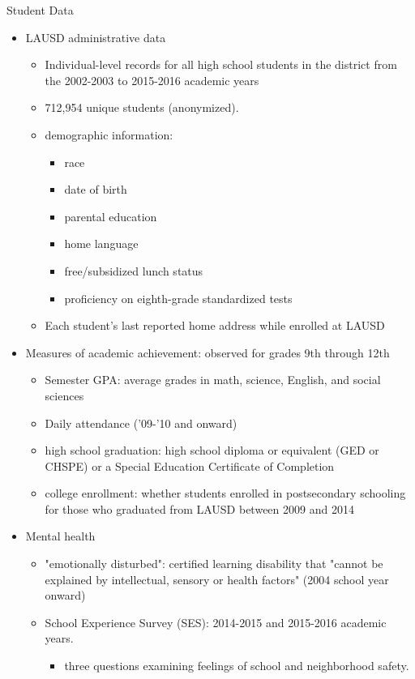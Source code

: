 \documentclass[dvipdfmx]{beamer}
\begin{document}
\begin{frame}{Student Data}
  \begin{itemize}
    \item LAUSD administrative data
    \begin{itemize}
      \item Individual-level records for all high school students in the district from the 2002-2003 to 2015-2016 academic years
      \item 712,954 unique students (anonymized).
      \item demographic information:
      \begin{itemize}
        \item race 
        \item date of birth 
        \item parental education 
        \item home language 
        \item free/subsidized lunch status
        \item proficiency on eighth-grade standardized tests
      \end{itemize}
      \item Each student's last reported home address while enrolled at LAUSD
    \end{itemize}
  \end{itemize}
\end{frame}

\begin{frame}{}
  \begin{itemize}
    \item Measures of academic achievement: observed for grades 9th through 12th
    \begin{itemize}
      \item Semester GPA: average grades in math, science, English, and social sciences
      \item Daily attendance ('09-'10 and onward)
      \item high school graduation: high school diploma or equivalent (GED or CHSPE) or a Special Education Certificate of Completion
      \item college enrollment: whether students enrolled in postsecondary schooling for those who graduated from LAUSD between 2009 and 2014
    \end{itemize}
    \item Mental health
    \begin{itemize}
      \item "emotionally disturbed": certified learning disability that "cannot be explained by intellectual, sensory or health factors" (2004 school year onward)
      \item School Experience Survey (SES): 2014-2015 and 2015-2016 academic years.
      \begin{itemize}
        \item three questions examining feelings of school and neighborhood safety.
      \end{itemize}
    \end{itemize}
  \end{itemize}
\end{frame}
\end{document}
